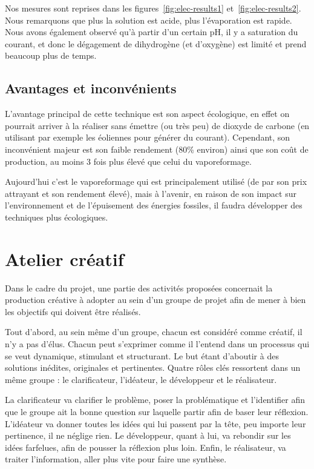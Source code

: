 Nos mesures sont reprises dans les figures~\ref{fig:elec-results1}
et~\ref{fig:elec-results2}.
Nous remarquons que plus la solution est acide, plus l'évaporation est rapide. Nous avons également observé qu'à partir d'un certain pH, il y a saturation du courant, et donc le dégagement de dihydrogène (et d'oxygène) est limité et prend beaucoup plus de temps.

\subsection{Avantages et inconvénients}
L'avantage principal de cette technique est son aspect écologique, en effet on pourrait arriver à la réaliser sans émettre (ou très peu) de dioxyde de carbone (en utilisant par exemple les éoliennes pour générer du courant). Cependant, son inconvénient majeur est son faible rendement (80\% environ) ainsi que son coût de production, au moins 3 fois plus élevé que celui du vaporeformage. \cite{wehicles-elec}

Aujourd'hui c'est le vaporeformage qui est principalement utilisé (de par son prix attrayant et son rendement élevé), mais à l'avenir, en raison de son impact sur l'environnement et de l'épuisement des énergies fossiles, il faudra développer des techniques plus écologiques. \cite{wehicles-vapo}

\section{Atelier créatif}
Dans le cadre du projet, une partie des activités proposées concernait la production créative à adopter au sein d'un groupe de projet afin de mener à bien les objectifs qui doivent être réalisés.

Tout d'abord, au sein même d'un groupe, chacun est considéré comme créatif, il n'y a pas d'élus. Chacun peut s'exprimer comme il l'entend dans un processus qui se veut dynamique, stimulant et structurant. Le but étant d'aboutir à des solutions inédites, originales et pertinentes.
Quatre rôles clés ressortent dans un même groupe : le clarificateur, l'idéateur, le développeur et le réalisateur.

La clarificateur va clarifier le problème, poser la problématique et l'identifier afin que le groupe ait la bonne question sur laquelle partir afin de baser leur réflexion. L'idéateur va donner toutes les idées qui lui passent par la tête, peu importe leur pertinence, il ne néglige rien. Le développeur, quant à lui, va rebondir sur les idées farfelues, afin de pousser la réflexion plus loin. Enfin, le réalisateur, va traiter l'information, aller plus vite pour faire une synthèse.

